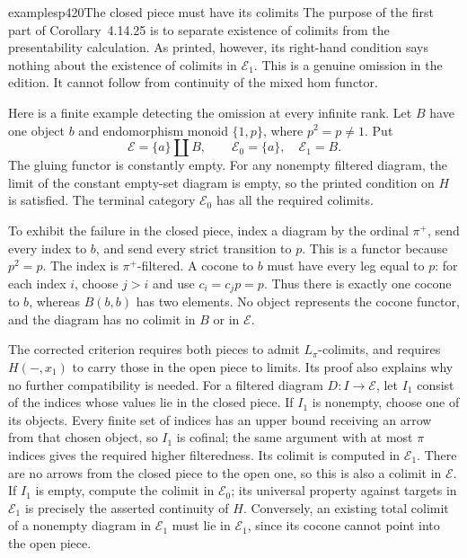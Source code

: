 \begin{dcomment}{examples}{p420}{The closed piece must have its colimits}
The purpose of the first part of Corollary~4.14.25 is to separate existence of colimits from the presentability calculation. As printed, however, its right-hand condition says nothing about the existence of colimits in $\mathcal E_1$. This is a genuine omission in the edition. It cannot follow from continuity of the mixed hom functor.

Here is a finite example detecting the omission at every infinite rank. Let $B$ have one object $b$ and endomorphism monoid $\{1,p\}$, where $p^2=p\ne1$. Put
\[
 \mathcal E=\{a\}\amalg B,\qquad
 \mathcal E_0=\{a\},\quad\mathcal E_1=B.
\]
The gluing functor is constantly empty. For any nonempty filtered diagram, the limit of the constant empty-set diagram is empty, so the printed condition on $H$ is satisfied. The terminal category $\mathcal E_0$ has all the required colimits.

To exhibit the failure in the closed piece, index a diagram by the ordinal $\pi^+$, send every index to $b$, and send every strict transition to $p$. This is a functor because $p^2=p$. The index is $\pi^+$-filtered. A cocone to $b$ must have every leg equal to $p$: for each index $i$, choose $j>i$ and use $c_i=c_jp=p$. Thus there is exactly one cocone to $b$, whereas $B(b,b)$ has two elements. No object represents the cocone functor, and the diagram has no colimit in $B$ or in $\mathcal E$.

The corrected criterion requires both pieces to admit $L_\pi$-colimits, and requires $H(-,x_1)$ to carry those in the open piece to limits. Its proof also explains why no further compatibility is needed. For a filtered diagram $D:I\to\mathcal E$, let $I_1$ consist of the indices whose values lie in the closed piece. If $I_1$ is nonempty, choose one of its objects. Every finite set of indices has an upper bound receiving an arrow from that chosen object, so $I_1$ is cofinal; the same argument with at most $\pi$ indices gives the required higher filteredness. Its colimit is computed in $\mathcal E_1$. There are no arrows from the closed piece to the open one, so this is also a colimit in $\mathcal E$. If $I_1$ is empty, compute the colimit in $\mathcal E_0$; its universal property against targets in $\mathcal E_1$ is precisely the asserted continuity of $H$. Conversely, an existing total colimit of a nonempty diagram in $\mathcal E_1$ must lie in $\mathcal E_1$, since its cocone cannot point into the open piece.
\end{dcomment}

